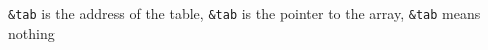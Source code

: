 {{\texttt{\&tab} is the address of the table},
 {\texttt{\&tab} is the pointer to the array},
 {\texttt{\&tab} means nothing}}